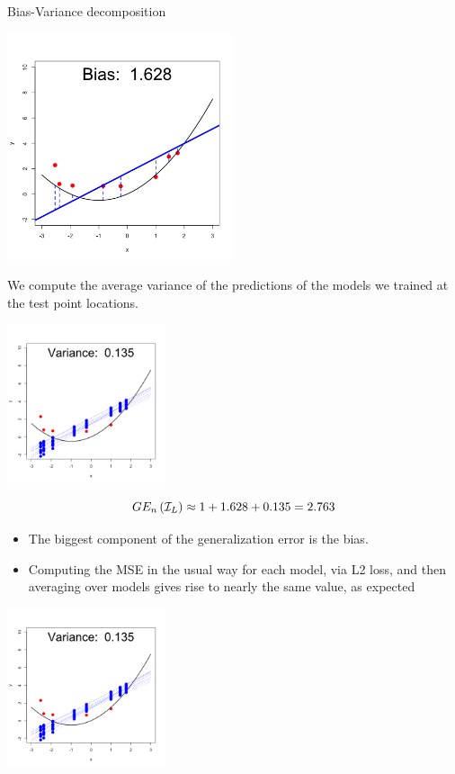\documentclass[11pt,compress,t,notes=noshow, xcolor=table]{beamer}
\begin{document}
\begin{vbframe} {Bias-Variance decomposition}
\begin{center}
  \includegraphics[width = 0.5\textwidth]{figure/bias_variance_decomposition-linear_model_bias.png}
\end{center}

\framebreak

We compute the average variance of the predictions of the models we trained at the test point locations.
\vspace{-0.35cm}
\begin{center}
  \includegraphics[width = 0.35\textwidth]{figure/bias_variance_decomposition-linear_model_variance.png}
\end{center}
\vspace{-0.8cm}

$$GE_n\left(\mathcal{I}_{L}\right) \approx 1 + 1.628 + 0.135 = 2.763 $$


\begin{itemize}
  \item The biggest component of the generalization error is the bias.
  \item Computing the MSE in the usual way for each model, via L2 loss, and then averaging over models gives rise to nearly the same value, as expected
\end{itemize}

\framebreak

\begin{center}
  \includegraphics[width = 0.35\textwidth]{figure/bias_variance_decomposition-linear_model_variance.png}
\end{center}


\end{vbframe}
\end{document}

